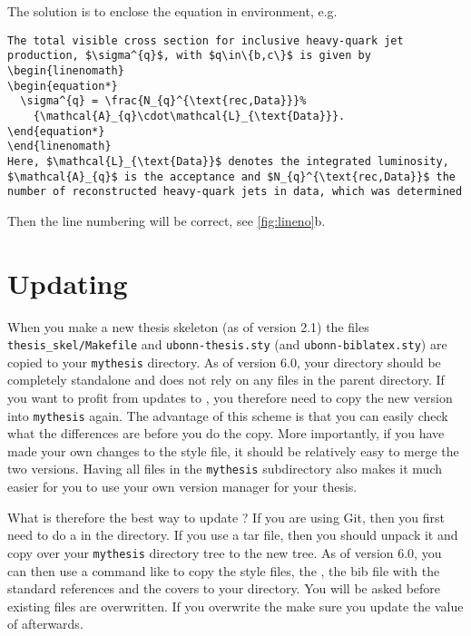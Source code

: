 The solution is to enclose the equation in  environment, e.g.
\begin{verbatim}
The total visible cross section for inclusive heavy-quark jet
production, $\sigma^{q}$, with $q\in\{b,c\}$ is given by
\begin{linenomath}
\begin{equation*}
  \sigma^{q} = \frac{N_{q}^{\text{rec,Data}}}%
    {\mathcal{A}_{q}\cdot\mathcal{L}_{\text{Data}}}.
\end{equation*}
\end{linenomath}
Here, $\mathcal{L}_{\text{Data}}$ denotes the integrated luminosity,
$\mathcal{A}_{q}$ is the acceptance and $N_{q}^{\text{rec,Data}}$ the
number of reconstructed heavy-quark jets in data, which was determined
\end{verbatim}
\noindent
Then the line numbering will be correct, see \cref{fig:lineno}b.


\section{Updating }
\label{sec:tips:update}

When you make a new thesis skeleton (as of version 2.1) the files
\texttt{thesis\_skel/Makefile} and \texttt{ubonn-thesis.sty} 
(and \texttt{ubonn-biblatex.sty}) are copied
to your \texttt{mythesis} directory.
As of version 6.0, your  directory should be completely standalone
and does not rely on any files in the parent directory.
If you want to profit from updates to ,
you therefore need to copy the new version into \texttt{mythesis} again.
The advantage of this scheme is
that you can easily check what the differences are before you do the
copy. More importantly, if you have made your own changes to the style
file, it should be relatively easy to merge the two versions. Having
all files in the \texttt{mythesis} subdirectory also makes it much easier
for you to use your own version manager for your thesis.

What is therefore the best way to update ?
If you are using Git, then you first need to do a 
in the  directory.
If you use a tar file, then you should unpack it and copy over your
\texttt{mythesis} directory tree to the new  tree.
As of version 6.0, you can then use a command like
 to copy the style files,
the , the bib file with the standard references and the covers to your
 directory.
You will be asked before existing files are overwritten.
If you overwrite the  make sure you update the value of  afterwards.

